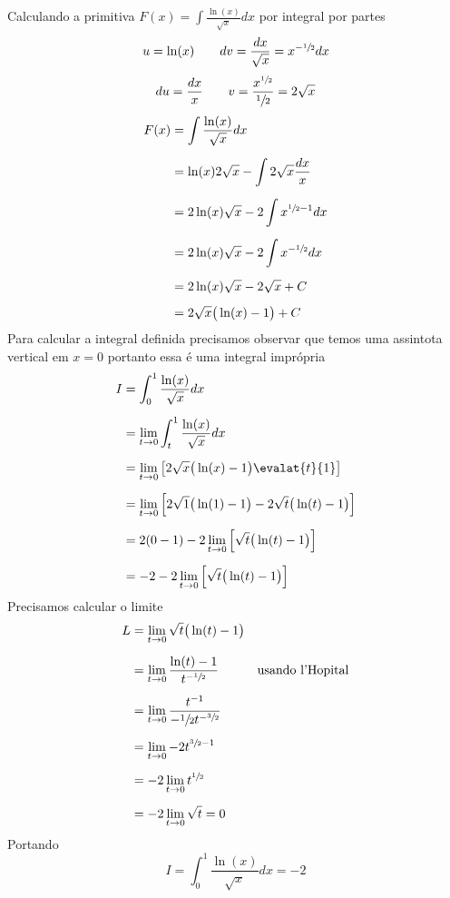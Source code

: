 \documentclass[a4paper,12pt,fleqn]{article}
\begin{document}
\begin{answer}
  Calculando a primitiva
  \(
    F(x) = \int \frac{\ln(x)}{\sqrt{x}} dx
  \)
  por integral por partes
  \[
    u = \ln(x)
    \qquad
    dv = \frac{dx}{\sqrt{x}} = x^{-\sfrac{1}{2}}dx
  \]
  \[
    du = \frac{dx}{x}
    \qquad
    v = \frac{x^{\sfrac{1}{2}}}{\sfrac{1}{2}} = 2\sqrt{x}
  \]
  \begin{align*}
    F(x)
    & = \int \frac{\ln(x)}{\sqrt{x}} dx \\[2mm]
    & = \ln(x) 2 \sqrt{x} - \int 2\sqrt{x} \frac{dx}{x} \\[2mm]
    & = 2\ln(x)\sqrt{x} - 2\int x^{\sfrac{1}{2}-1} dx \\[2mm]
    & = 2\ln(x)\sqrt{x} - 2\int x^{-\sfrac{1}{2}} dx \\[2mm]
    & = 2\ln(x)\sqrt{x} - 2\sqrt{x} + C \\[2mm]
    & = 2\sqrt{x}\big( \ln(x) - 1\big) + C
  \end{align*}
  Para calcular a integral definida precisamos observar que temos uma assintota
  vertical em $x=0$ portanto essa é uma integral imprópria
  \begin{align*}
    I
    & = \int_0^1 \frac{\ln(x)}{\sqrt{x}} dx \\[2mm]
    & = \lim_{t\to0} \int_t^1 \frac{\ln(x)}{\sqrt{x}} dx \\[2mm]
    & = \lim_{t\to0} \left[ 2\sqrt{x}\big( \ln(x) - 1\big)\evalat{t}{1}\right]  \\[2mm]
    & = \lim_{t\to0} \left[ 2\sqrt{1}\big( \ln(1) - 1\big)
                          - 2\sqrt{t}\big( \ln(t) - 1\big) \right]   \\[2mm]
    & = 2( 0 - 1) -2 \lim_{t\to0} \left[\sqrt{t}\big(\ln(t) - 1\big) \right] \\[2mm]
    & = -2 -2 \lim_{t\to0} \left[\sqrt{t}\big(\ln(t) - 1\big) \right]
  \end{align*}
  Precisamos calcular o limite
  \begin{align*}
    L
    & = \lim_{t\to0} \sqrt{t}\big(\ln(t) - 1\big)  \\[2mm]
    & = \lim_{t\to0} \frac{\ln(t)-1}{t^{-\sfrac{1}{2}}} & \text{usando l'Hopital}\\[2mm]
    & = \lim_{t\to0} \frac{t^{-1}}{-\sfrac{1}{2}t^{-\sfrac{3}{2}}} \\[2mm]
    & = \lim_{t\to0} -2 t^{\sfrac{3}{2}-1} \\[2mm]
    & = -2 \lim_{t\to0} t^{\sfrac{1}{2}} \\[2mm]
    & = -2 \lim_{t\to0} \sqrt{t} = 0
  \end{align*}
  Portando
  \[
    I = \int_0^1 \frac{\ln(x)}{\sqrt{x}} dx = -2
  \]
\end{answer}
\end{document}
